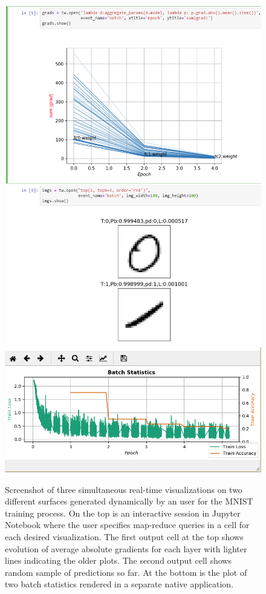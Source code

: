 \documentclass[sigchi]{acmart} %
\begin{document}
\begin{figure}[h]
  \centering
  \includegraphics[width=\linewidth]{tensorwatch-screenshot}
  \includegraphics[width=\linewidth]{tensorwatch-screenshot2}  
  \caption{Screenshot of three simultaneous real-time visualizations on two different surfaces generated dynamically by an user for the MNIST training process. On the top is an interactive session in Jupyter Notebook where the user specifies map-reduce queries in a cell for each desired visualization. The first output cell at the top shows evolution of average absolute gradients for each layer with lighter lines indicating the older plots. The second output cell shows random sample of predictions so far. At the bottom is the plot of two batch statistics rendered in a separate native application.}  
\end{figure}
\end{document}
